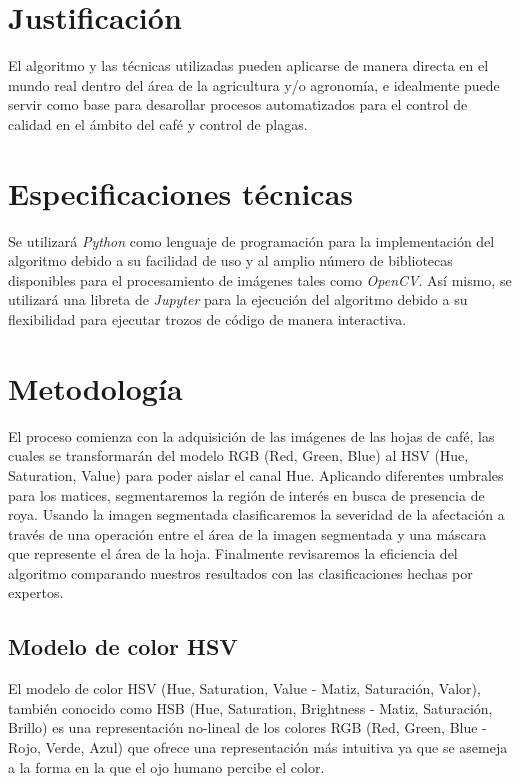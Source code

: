 \section{Justificación}
El algoritmo y las técnicas utilizadas pueden aplicarse de manera directa en el mundo real dentro del área de la agricultura y/o agronomía, e idealmente puede servir como base para desarollar procesos automatizados para el control de calidad en el ámbito del café y control de plagas.
 
\section{Especificaciones técnicas}
Se utilizará \textit{Python} como lenguaje de programación para la implementación del algoritmo debido a su facilidad de uso y al amplio número de bibliotecas disponibles para el procesamiento de imágenes tales como \textit{OpenCV}. Así mismo, se utilizará una libreta de \textit{Jupyter} para la ejecución del algoritmo debido a su flexibilidad para ejecutar trozos de código de manera interactiva.

\section{Metodología}
El proceso comienza con la adquisición de las imágenes de las hojas de café, las cuales se transformarán del modelo RGB (Red, Green, Blue) al HSV (Hue, Saturation, Value) para poder aislar el canal Hue. Aplicando diferentes umbrales para los matices, segmentaremos la región de interés en busca de presencia de roya. Usando la imagen segmentada clasificaremos la severidad de la afectación a través de una operación entre el área de la imagen segmentada y una máscara que represente el área de la hoja. Finalmente revisaremos la eficiencia del algoritmo comparando nuestros resultados con las clasificaciones hechas por expertos.

\subsection{Modelo de color HSV}
El modelo de color HSV (Hue, Saturation, Value - Matiz, Saturación, Valor), también conocido como HSB (Hue, Saturation, Brightness - Matiz, Saturación, Brillo) es una representación no-lineal de los colores RGB (Red, Green, Blue - Rojo, Verde, Azul) que ofrece una representación más intuitiva ya que se asemeja a la forma en la que el ojo humano percibe el color.

